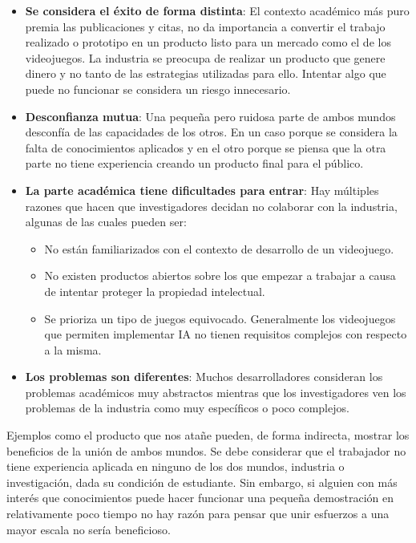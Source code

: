\begin{itemize}
	\item \textbf{Se considera el éxito de forma distinta}: El contexto académico más puro premia las publicaciones y citas, no da importancia a convertir el trabajo realizado o prototipo en un producto listo para un mercado como el de los videojuegos. La industria se preocupa de realizar un producto que genere dinero y no tanto de las estrategias utilizadas para ello. Intentar algo que puede no funcionar se considera un riesgo innecesario.
	\item \textbf{Desconfianza mutua}: Una pequeña pero ruidosa parte de ambos mundos desconfía de las capacidades de los otros. En un caso porque se considera la falta de conocimientos aplicados y en el otro porque se piensa que la otra parte no tiene experiencia creando un producto final para el público.
	\item \textbf{La parte académica tiene dificultades para entrar}: Hay múltiples razones que hacen que investigadores decidan no colaborar con la industria, algunas de las cuales pueden ser:
		\begin{itemize}
			\item No están familiarizados con el contexto de desarrollo de un videojuego.
			\item No existen productos abiertos sobre los que empezar a trabajar a causa de intentar proteger la propiedad intelectual.
			\item Se prioriza un tipo de juegos equivocado. Generalmente los videojuegos que permiten implementar IA no tienen requisitos complejos con respecto a la misma.
		\end{itemize}
	\item \textbf{Los problemas son diferentes}: Muchos desarrolladores consideran los problemas académicos muy abstractos mientras que los investigadores ven los problemas de la industria como muy específicos o poco complejos.
\end{itemize}

\bigskip

Ejemplos como el producto que nos atañe pueden, de forma indirecta, mostrar los beneficios de la unión de ambos mundos. Se debe considerar que el trabajador no tiene experiencia aplicada en ninguno de los dos mundos, industria o investigación, dada su condición de estudiante. Sin embargo, si alguien con más interés que conocimientos puede hacer funcionar una pequeña demostración en relativamente poco tiempo no hay razón para pensar que unir esfuerzos a una mayor escala no sería beneficioso.

